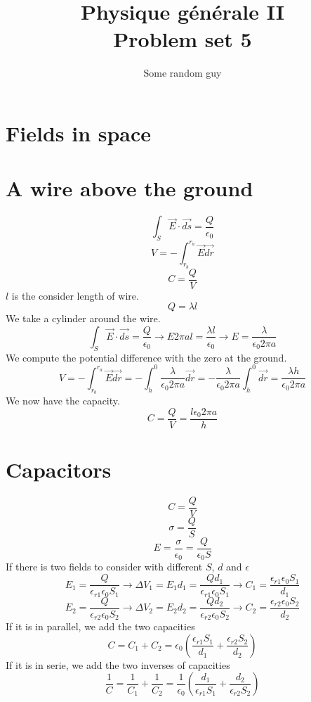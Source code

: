 \documentclass{article}
\begin{document}
\title{Physique g\'en\'erale II\\
Problem set 5}
\author{Some random guy}
\maketitle

\section{Fields in space}

\section{A wire above the ground}
\[
	\int_S \vec{E} \cdot \vec{ds} = \frac{Q}{\epsilon_0}
\]
\[
	V = - \int_{r_b}^{r_a} \vec{E} \vec{dr}
\]
\[
	C = \frac{Q}{V}
\]
\(l\) is the consider length of wire.
\[
	Q = \lambda l
\]
We take a cylinder around the wire.
\[
	\int_S \vec{E} \cdot \vec{ds} = \frac{Q}{\epsilon_0}
	\to E 2 \pi a l = \frac{\lambda l}{\epsilon_0}
	\to E = \frac{\lambda}{\epsilon_0 2 \pi a}
\]
We compute the potential difference with the zero at the ground.
\[
	V = - \int_{r_b}^{r_a} \vec{E} \vec{dr}
	= - \int_{h}^{0} \frac{\lambda}{\epsilon_0 2 \pi a} \vec{dr}
	= - \frac{\lambda}{\epsilon_0 2 \pi a} \int_{h}^{0} \vec{dr}
	= \frac{\lambda h}{\epsilon_0 2 \pi a}
\]
We now have the capacity.
\[
	C = \frac{Q}{V}
	= \frac{l \epsilon_0 2 \pi a}{h}
\]

\section{Capacitors}

\[
	C = \frac{Q}{V}
\]
\[
	\sigma = \frac{Q}{S}
\]
\[
	E = \frac{\sigma}{\epsilon_0} = \frac{Q}{\epsilon_0 S}
\]
If there is two fields to consider with different \(S\), \(d\) and \(\epsilon\)
\[
	E_1 = \frac{Q}{\epsilon_{r1} \epsilon_0 S_1}
	\to \Delta V_1 = E_1 d_1 = \frac{Q d_1}{\epsilon_{r1} \epsilon_0 S_1}
	\to C_1 = \frac{\epsilon_{r1} \epsilon_0 S_1}{d_1}
\]
\[
	E_2 = \frac{Q}{\epsilon_{r2} \epsilon_0 S_2}
	\to \Delta V_2 = E_2 d_2 = \frac{Q d_2}{\epsilon_{r2} \epsilon_0 S_2}
	\to C_2 = \frac{\epsilon_{r2} \epsilon_0 S_2}{d_2}
\]
If it is in parallel, we add the two capacities
\[
	C = C_1 + C_2 = \epsilon_0
	( \frac{\epsilon_{r1} S_1}{d_1} + \frac{\epsilon_{r2} S_2}{d_2} )
\]
If it is in serie, we add the two inverses of capacities
\[
	\frac{1}{C} = \frac{1}{C_1} + \frac{1}{C_2}
	= \frac{1}{\epsilon_0}
	( \frac{d_1}{\epsilon_{r1} S_1} +
	\frac{d_2}{\epsilon_{r2} S_2} )
\]
\end{document}
